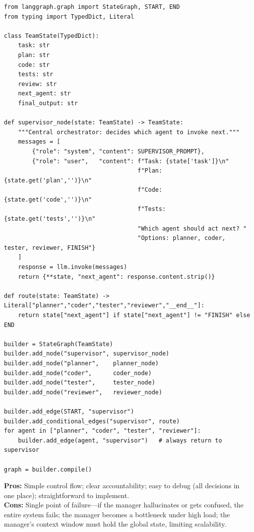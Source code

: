 \begin{examplebox}
\begin{lstlisting}[style=pythonstyle]
from langgraph.graph import StateGraph, START, END
from typing import TypedDict, Literal

class TeamState(TypedDict):
    task: str
    plan: str
    code: str
    tests: str
    review: str
    next_agent: str
    final_output: str

def supervisor_node(state: TeamState) -> TeamState:
    """Central orchestrator: decides which agent to invoke next."""
    messages = [
        {"role": "system", "content": SUPERVISOR_PROMPT},
        {"role": "user",   "content": f"Task: {state['task']}\n"
                                      f"Plan: {state.get('plan','')}\n"
                                      f"Code: {state.get('code','')}\n"
                                      f"Tests: {state.get('tests','')}\n"
                                      "Which agent should act next? "
                                      "Options: planner, coder, tester, reviewer, FINISH"}
    ]
    response = llm.invoke(messages)
    return {**state, "next_agent": response.content.strip()}

def route(state: TeamState) -> Literal["planner","coder","tester","reviewer","__end__"]:
    return state["next_agent"] if state["next_agent"] != "FINISH" else END

builder = StateGraph(TeamState)
builder.add_node("supervisor", supervisor_node)
builder.add_node("planner",    planner_node)
builder.add_node("coder",      coder_node)
builder.add_node("tester",     tester_node)
builder.add_node("reviewer",   reviewer_node)

builder.add_edge(START, "supervisor")
builder.add_conditional_edges("supervisor", route)
for agent in ["planner", "coder", "tester", "reviewer"]:
    builder.add_edge(agent, "supervisor")   # always return to supervisor

graph = builder.compile()
\end{lstlisting}
\end{examplebox}

\begin{warningbox}
\textbf{Pros:} Simple control flow; clear accountability; easy to debug (all decisions in one place); straightforward to implement.\\

\textbf{Cons:} Single point of failure---if the manager hallucinates or gets confused, the entire system fails; the manager becomes a bottleneck under high load; the manager’s context window must hold the global state, limiting scalability.
\end{warningbox}

